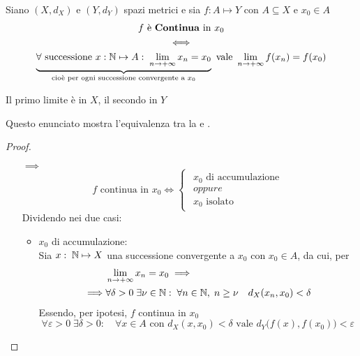 \begin{proposition}
	\label{prop:cont_e_cont_per_succ}
	Siano $(X,d_X)$ e $(Y,d_Y)$ spazi metrici e sia $f: A \mapsto Y$ con $A \subseteq X$ e $x_0 \in A$
	\begin{equation*}
		\begin{gathered}
			f \text{ è \textbf{Continua} in } x_0\\
			\iff\\
			\underbrace{\forall \text{ successione } x:\mathbb{N} \mapsto A:\; \lim\limits_{n \to +\infty} x_n = x_0}_{\text{cioè per ogni successione convergente a } x_0} \text{ vale } \lim\limits_{n \to +\infty} f(x_n) = f(x_0)
		\end{gathered}
	\end{equation*}
	\begin{note}
		Il primo limite è in $X$, il secondo in $Y$
	\end{note}
	\begin{note}
		Questo enunciato mostra l'equivalenza tra la  e .
	\end{note}
	\begin{proof}~
		\begin{itemize}
			\item[$\implies$]
			\[f \text{ continua in } x_0 \iff
				\begin{cases}
					\begin{array}{c}
						x_0 \text{ di accumulazione}\\
						oppure\\
						x_0 \text{ isolato}
					\end{array}
				\end{cases}\]
				Dividendo nei due casi:
				\begin{itemize}
					\item $x_0$ di accumulazione:\\
						Sia $x:\; \mathbb{N} \mapsto X$ una successione convergente a $x_0$ con $x_0 \in A$, da cui, per 
						\begin{align*}
							& \lim\limits_{n \to +\infty} x_n = x_0 \implies\\
							\implies & \forall \delta > 0\; \exists \nu \in \mathbb{N}:\; \forall n \in \mathbb{N},\; n \geq \nu \quad d_X(x_n, x_0) < \delta
						\end{align*}
						Essendo, per ipotesi, $f$ continua in $x_0$
						\begin{equation*}
							\forall \varepsilon > 0\; \exists \delta > 0:\quad \forall x \in A \text{ con } d_X(x,x_0)<\delta \text{ vale } d_Y \bigl(f(x),f(x_0)\bigr) < \varepsilon

\end{equation*}
\end{itemize}
\end{itemize}
\end{proof}
\end{proposition}
